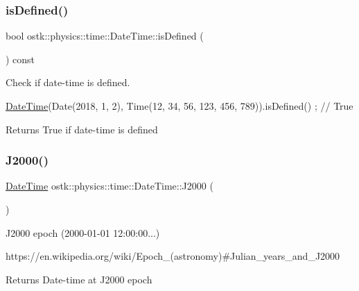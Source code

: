 \subsubsection{\texorpdfstring{is\+Defined()}{isDefined()}}
{\footnotesize\ttfamily bool ostk\+::physics\+::time\+::\+Date\+Time\+::is\+Defined (\begin{DoxyParamCaption}{ }\end{DoxyParamCaption}) const}



Check if date-\/time is defined. 


\begin{DoxyCode}
\hyperlink{classostk_1_1physics_1_1time_1_1_date_time_a974b5a7581ae7461ccf0e6ab85e42633}{DateTime}(Date(2018, 1, 2), Time(12, 34, 56, 123, 456, 789)).isDefined() ; \textcolor{comment}{// True}
\end{DoxyCode}


\begin{DoxyReturn}{Returns}
True if date-\/time is defined 
\end{DoxyReturn}
\mbox{\label{classostk_1_1physics_1_1time_1_1_date_time_a819a122626c39c4cc99429f5ae9fa749}} 
\subsubsection{\texorpdfstring{J2000()}{J2000()}}
{\footnotesize\ttfamily \hyperlink{classostk_1_1physics_1_1time_1_1_date_time}{Date\+Time} ostk\+::physics\+::time\+::\+Date\+Time\+::\+J2000 (\begin{DoxyParamCaption}{ }\end{DoxyParamCaption})\hspace{0.3cm}{\ttfamily [static]}}



J2000 epoch (2000-\/01-\/01 12\+:00\+:00...) 

https\+://en.wikipedia.\+org/wiki/\+Epoch\+\_\+(astronomy)\#\+Julian\+\_\+years\+\_\+and\+\_\+\+J2000

\begin{DoxyReturn}{Returns}
Date-\/time at J2000 epoch 
\end{DoxyReturn}
\mbox{\label{classostk_1_1physics_1_1time_1_1_date_time_a12ae2e3669cf32a915079228979d67ae}} 
